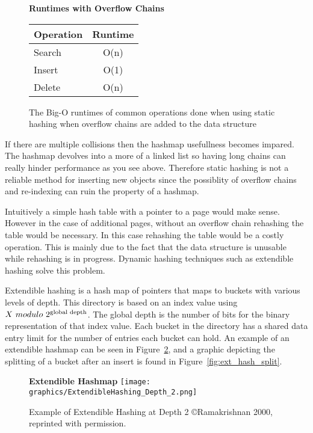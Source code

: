 \documentclass[letterpaper, 11pt]{article}
\begin{document}
\begin{figure}[H]
\centering
\textbf{Runtimes with Overflow Chains}
\\
\begin{tabular}{l | c}
  \hline
  Operation & Runtime \\ \hline \hline
  Search & O(n) \\ \hline
  Insert & O(1) \\ \hline
  Delete & O(n) \\ \hline
\end{tabular}
\caption{The Big-O runtimes of common operations done when using static hashing
when overflow chains are added to the data structure}
\label{fig:static_hash_runtimes_overflow}
\end{figure}

If there are multiple collisions then the hashmap usefullness becomes impared. The hashmap devolves into a more
of a linked list so having long chains can really hinder performance as you see above. Therefore static hashing
is not a reliable method for inserting new objects since the possiblity of overflow chains and re-indexing can
ruin the property of a hashmap.
\par\vspace{\baselineskip}

Intuitively a simple hash table with a pointer to a page would make sense. However in the case of
additional pages, without an overflow chain rehashing the table would be necessary. In this
case rehashing the table would be a costly operation. This is mainly due to the fact that the data structure is unusable
while rehashing is in progress. Dynamic hashing techniques such as extendible hashing solve this problem.
\par\vspace{\baselineskip}

Extendible hashing is a hash map of pointers that maps to buckets with various levels of depth. This directory
is based on an index value using $ X\ modulo\ 2\textsuperscript{global depth} $. The global depth is the number of bits for the binary
representation of that index value. Each bucket in the directory has a shared data entry limit for the number of
entries each bucket can hold. An example of an extendible hashmap can be seen in Figure~\ref{fig:ext_hash_example},
and a graphic depicting the splitting of a bucket after an insert is found in Figure~\ref{fig:ext_hash_split}.

\begin{figure}[H]
  \centering
  \textbf{Extendible Hashmap}
  \texttt{[image: graphics/ExtendibleHashing\_Depth\_2.png]}
  \caption{Example of Extendible Hashing at Depth 2 \copyright Ramakrishnan 2000, reprinted with permission.\cite{ramakrishnan2000database}}
  \label{fig:ext_hash_example}
\end{figure}
\end{document}
